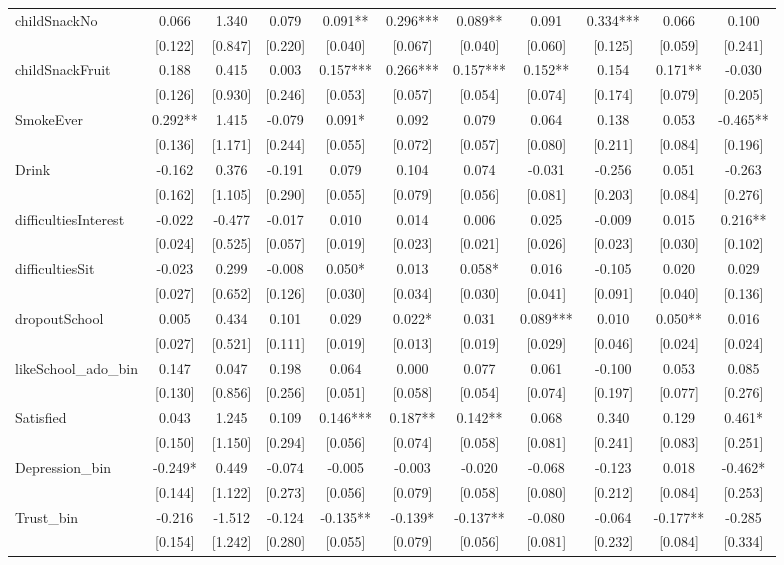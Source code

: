 \documentclass[12pt]{article}
\begin{document}
\begin{table}[ht]
\begin{center}
\begin{adjustbox}{width=1.2\textwidth,center=\textwidth}
\begin{tabular}{l*{10}{c}}
childSnackNo & 0.066 & 1.340 & 0.079 & 0.091** & 0.296*** & 0.089** & 0.091 & 0.334*** & 0.066 & 0.100 \\
 & [0.122] & [0.847] & [0.220] & [0.040] & [0.067] & [0.040] & [0.060] & [0.125] & [0.059] & [0.241] \\
childSnackFruit & 0.188 & 0.415 & 0.003 & 0.157*** & 0.266*** & 0.157*** & 0.152** & 0.154 & 0.171** & -0.030 \\
 & [0.126] & [0.930] & [0.246] & [0.053] & [0.057] & [0.054] & [0.074] & [0.174] & [0.079] & [0.205] \\
SmokeEver & 0.292** & 1.415 & -0.079 & 0.091* & 0.092 & 0.079 & 0.064 & 0.138 & 0.053 & -0.465** \\
 & [0.136] & [1.171] & [0.244] & [0.055] & [0.072] & [0.057] & [0.080] & [0.211] & [0.084] & [0.196] \\
Drink & -0.162 & 0.376 & -0.191 & 0.079 & 0.104 & 0.074 & -0.031 & -0.256 & 0.051 & -0.263 \\
 & [0.162] & [1.105] & [0.290] & [0.055] & [0.079] & [0.056] & [0.081] & [0.203] & [0.084] & [0.276] \\
difficultiesInterest & -0.022 & -0.477 & -0.017 & 0.010 & 0.014 & 0.006 & 0.025 & -0.009 & 0.015 & 0.216** \\
 & [0.024] & [0.525] & [0.057] & [0.019] & [0.023] & [0.021] & [0.026] & [0.023] & [0.030] & [0.102] \\
difficultiesSit & -0.023 & 0.299 & -0.008 & 0.050* & 0.013 & 0.058* & 0.016 & -0.105 & 0.020 & 0.029 \\
 & [0.027] & [0.652] & [0.126] & [0.030] & [0.034] & [0.030] & [0.041] & [0.091] & [0.040] & [0.136] \\
dropoutSchool & 0.005 & 0.434 & 0.101 & 0.029 & 0.022* & 0.031 & 0.089*** & 0.010 & 0.050** & 0.016 \\
 & [0.027] & [0.521] & [0.111] & [0.019] & [0.013] & [0.019] & [0.029] & [0.046] & [0.024] & [0.024] \\
likeSchool\_ado\_bin & 0.147 & 0.047 & 0.198 & 0.064 & 0.000 & 0.077 & 0.061 & -0.100 & 0.053 & 0.085 \\
 & [0.130] & [0.856] & [0.256] & [0.051] & [0.058] & [0.054] & [0.074] & [0.197] & [0.077] & [0.276] \\
Satisfied & 0.043 & 1.245 & 0.109 & 0.146*** & 0.187** & 0.142** & 0.068 & 0.340 & 0.129 & 0.461* \\
 & [0.150] & [1.150] & [0.294] & [0.056] & [0.074] & [0.058] & [0.081] & [0.241] & [0.083] & [0.251] \\
Depression\_bin & -0.249* & 0.449 & -0.074 & -0.005 & -0.003 & -0.020 & -0.068 & -0.123 & 0.018 & -0.462* \\
 & [0.144] & [1.122] & [0.273] & [0.056] & [0.079] & [0.058] & [0.080] & [0.212] & [0.084] & [0.253] \\
Trust\_bin & -0.216 & -1.512 & -0.124 & -0.135** & -0.139* & -0.137** & -0.080 & -0.064 & -0.177** & -0.285 \\
 & [0.154] & [1.242] & [0.280] & [0.055] & [0.079] & [0.056] & [0.081] & [0.232] & [0.084] & [0.334] \\


\end{tabular}
\end{adjustbox}
\end{center}
\end{table}
\end{document}
